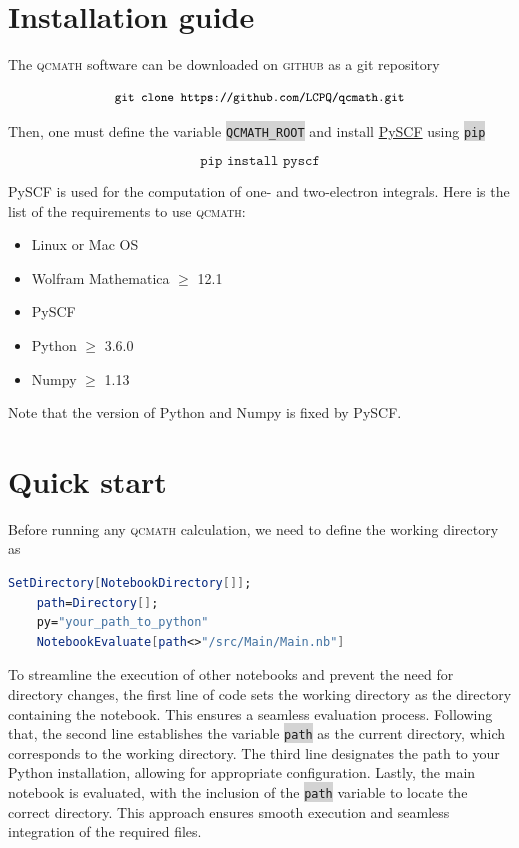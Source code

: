 \documentclass[aip,jcp,reprint,noshowkeys,superscriptaddress]{revtex4-1}
\newcommand{\qcmath}{\textsc{qcmath}\xspace}
\newcommand{\pyscf}{PySCF\xspace}
\newcommand{\keyword}[1]{{\colorbox{lightgray}{\texttt{#1}}}}
\begin{document}
\section{Installation guide}
The \qcmath software can be downloaded on \textsc{github} as a git repository
\begin{tcolorbox}[colback=lightgray,colframe=white]
	\begin{equation*}
		\small
		\texttt{git clone https://github.com/LCPQ/qcmath.git}
	\end{equation*}
\end{tcolorbox}
Then, one must define the variable \keyword{QCMATH\_ROOT} and install \href{https://pyscf.org}{\pyscf} using \keyword{pip}
\begin{tcolorbox}[colback=lightgray,colframe=white]
	\begin{equation*}
		\texttt{pip install pyscf}
	\end{equation*}
\end{tcolorbox}
\pyscf is used for the computation of one- and two-electron integrals. Here is the list of the requirements to use \qcmath:
\begin{itemize}
	\item Linux or Mac OS
	\item Wolfram Mathematica $\geq$ 12.1
	\item \pyscf
	\item Python $\geq$ 3.6.0 
	\item Numpy $\geq$ 1.13
	\end{itemize}
Note that the version of Python and Numpy is fixed by \pyscf.

\section{Quick start}
Before running any \qcmath calculation, we need to define the working directory as 
\begin{lstlisting}[extendedchars=true,language=Mathematica]
	SetDirectory[NotebookDirectory[]];
	path=Directory[];
	py="your_path_to_python"
	NotebookEvaluate[path<>"/src/Main/Main.nb"]
\end{lstlisting}
To streamline the execution of other notebooks and prevent the need for directory changes, the first line of code sets the working directory as the directory containing the notebook. This ensures a seamless evaluation process. Following that, the second line establishes the variable \keyword{path} as the current directory, which corresponds to the working directory. The third line designates the path to your Python installation, allowing for appropriate configuration. Lastly, the main notebook is evaluated, with the inclusion of the \keyword{path} variable to locate the correct directory. This approach ensures smooth execution and seamless integration of the required files.
\end{document}
